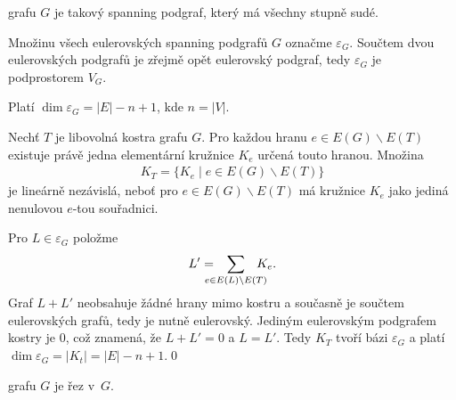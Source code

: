  grafu $G$ je takový spanning podgraf, který má všechny stupně sudé.

\medskip
Množinu všech eulerovských spanning podgrafů $G$ označme $\varepsilon_G$. Součtem dvou eulerovských podgrafů je zřejmě opět eulerovský podgraf, tedy $\varepsilon_G$ je podprostorem $V_G$.

\lm Platí $\dim \varepsilon_G = |E| - n + 1$, kde $n=|V|$.

\dk Nechť $T$ je libovolná kostra grafu $G$. Pro každou hranu $e\in E(G)\backslash E(T)$ existuje právě jedna elementární kružnice $K_e$ určená touto hranou. Množina
\begin{align}
K_T=\{ K_e\mid e \in E(G) \backslash E(T) \}
\end{align}
je lineárně nezávislá, neboť pro $e\in E(G)\backslash E(T)$ má kružnice $K_e$ jako jediná nenulovou $e$-tou souřadnici.

Pro $L\in\varepsilon_G$ položme
\begin{align}
	L'=\hspace{-10pt}\sum_{e\in E(L)\backslash E(T)}\hspace{-10pt}K_e.
\end{align}
Graf $L+L'$ neobsahuje žádné hrany mimo kostru a současně je součtem eulerovských grafů, tedy je nutně eulerovský. Jediným eulerovským podgrafem kostry je $0$, což znamená, že $L+L'=0$ a $L=L'$. Tedy $K_T$ tvoří bázi $\varepsilon_G$ a platí $\dim \varepsilon_G = |K_t|=|E| - n + 1$.\qed

 grafu $G$ je řez v~$G$.

